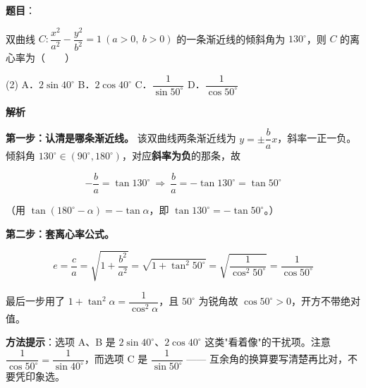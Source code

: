 \begin{answer}

\textbf{题目}：

双曲线 $C:\dfrac{x^{2}}{a^{2}}-\dfrac{y^{2}}{b^{2}}=1\ (a>0,\ b>0)$ 的一条渐近线的倾斜角为 $130^\circ$，则 $C$ 的离心率为\mbox{（　　）}

\begin{gkopts}(2)
\task A．$2\sin40^\circ$
\task B．$2\cos40^\circ$
\task C．$\dfrac1{\sin50^\circ}$
\task D．$\dfrac1{\cos50^\circ}$
\end{gkopts}

\textbf{解析}

\textbf{第一步：认清是哪条渐近线。} 该双曲线两条渐近线为 $y=\pm\dfrac ba x$，斜率一正一负。倾斜角 $130^\circ\in(90^\circ,180^\circ)$，对应\textbf{斜率为负}的那条，故

\nopagebreak[4]
\[-\frac ba=\tan130^\circ\ \Longrightarrow\ \frac ba=-\tan130^\circ=\tan50^\circ\]

（用 $\tan(180^\circ-\alpha)=-\tan\alpha$，即 $\tan130^\circ=-\tan50^\circ$。）

\textbf{第二步：套离心率公式。}

\nopagebreak[4]
\[e=\frac ca=\sqrt{1+\frac{b^{2}}{a^{2}}}=\sqrt{1+\tan^{2}50^\circ}=\sqrt{\frac1{\cos^{2}50^\circ}}=\frac1{\cos50^\circ}\]

最后一步用了 $1+\tan^{2}\alpha=\dfrac1{\cos^{2}\alpha}$，且 $50^\circ$ 为锐角故 $\cos50^\circ>0$，开方不带绝对值。

\begin{gktip}
\textbf{方法提示}：选项 A、B 是 $2\sin40^\circ$、$2\cos40^\circ$ 这类"看着像"的干扰项。注意 $\dfrac1{\cos50^\circ}=\dfrac1{\sin40^\circ}$，而选项 C 是 $\dfrac1{\sin50^\circ}$ —— 互余角的换算要写清楚再比对，不要凭印象选。
\end{gktip}


\par\medskip

\end{answer}
